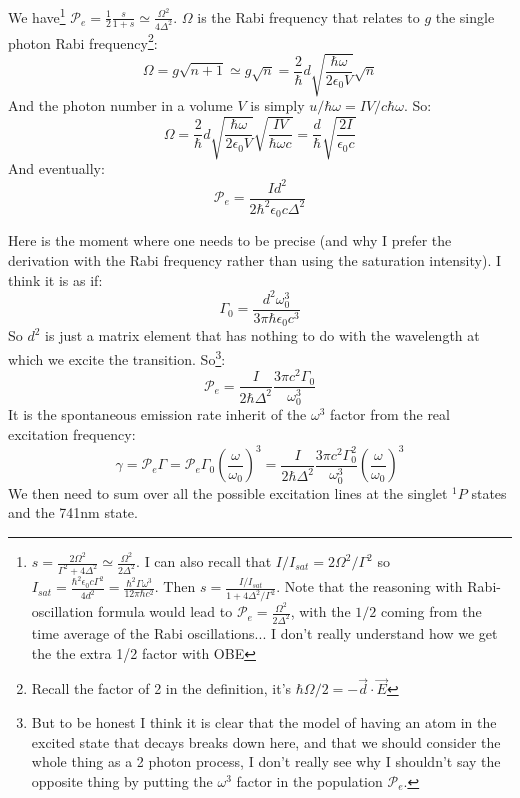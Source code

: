 \documentclass[reprint,amsmath,amssymb,aps,nofootinbib]{revtex4-1}
\begin{document}
We have\footnote{$s = \frac{2\Omega^{2}}{\Gamma^{2}+4\Delta^{2}}\simeq\frac{\Omega^{2}}{2\Delta^{2}}$. I can also recall that $I/I_{sat} = 2\Omega^{2}/\Gamma^{2}$ so $I_{sat} = \frac{\hbar^{2}\epsilon_{0}c\Gamma^{2}}{4d^{2}} = \frac{\hbar^{2}\Gamma\omega^{3}}{12\pi\hbar c^{2}}$. Then $s = \frac{I/I_{sat}}{1+4\Delta^{2}/\Gamma^{2}}$. Note that the reasoning with Rabi-oscillation formula would lead to $\mathcal{P}_{e} = \frac{\Omega^{2}}{2\Delta^{2}}$, with the $1/2$ coming from the time average of the Rabi oscillations... I don't really understand how we get the the extra 1/2 factor with OBE} $\mathcal{P}_{e}=\frac{1}{2}\frac{s}{1+s}\simeq \frac{\Omega^{2}}{4\Delta^{2}}$. $\Omega$ is the Rabi frequency that relates to $g$ the single photon Rabi frequency\footnote{Recall the factor of 2 in the definition, it's $\hbar\Omega/2=-\vec{d}\cdot \vec{E}$}:
\begin{equation}
\Omega = g\sqrt{n+1}\simeq g\sqrt{n} = \frac{2}{\hbar}d\sqrt{\frac{\hbar\omega}{2\epsilon_{0}V}}\sqrt{n}
\end{equation}
And the photon number in a volume $V$ is simply $u/\hbar\omega = IV/c\hbar\omega$. So:
\begin{equation}
\Omega = \frac{2}{\hbar}d\sqrt{\frac{\hbar\omega}{2\epsilon_{0}V}}\sqrt{\frac{IV}{\hbar\omega c}}= \frac{d}{\hbar}\sqrt{\frac{2I}{\epsilon_{0}c}}
\end{equation}
And eventually:
\begin{equation}
\mathcal{P}_{e} = \frac{Id^{2}}{2\hbar^{2}\epsilon_{0}c\Delta^{2}}
\end{equation}

Here is the moment where one needs to be precise (and why I prefer the derivation with the Rabi frequency rather than using the saturation intensity). I think it is as if:
\begin{equation}
\Gamma_{0} = \frac{d^{2}\omega_{0}^{3}}{3\pi\hbar\epsilon_{0}c^{3}}
\end{equation}
So $d^{2}$ is just a matrix element that has nothing to do with the wavelength at which we excite the transition. So\footnote{But to be honest I think it is clear that the model of having an atom in the excited state that decays breaks down here, and that we should consider the whole thing as a 2 photon process, I don't really see why I shouldn't say the opposite thing by putting the $\omega^{3}$ factor in the population $\mathcal{P}_{e}$.}:
\begin{equation}
\mathcal{P}_{e} = \frac{I}{2\hbar\Delta^{2}}\frac{3\pi c^{2}\Gamma_{0}}{\omega_{0}^{3}}
\end{equation}
It is the spontaneous emission rate inherit of the $\omega^{3}$ factor from the real excitation frequency:
\begin{equation}
\gamma = \mathcal{P}_{e}\Gamma = \mathcal{P}_{e}\Gamma_{0}\left(\frac{\omega}{\omega_{0}}\right)^{3} = \frac{I}{2\hbar\Delta^{2}}\frac{3\pi c^{2}\Gamma_{0}^{2}}{\omega_{0}^{3}}\left(\frac{\omega}{\omega_{0}}\right)^{3}
\end{equation}
We then need to sum over all the possible excitation lines at the singlet ${}^{1}P$ states and the 741nm state.
\end{document}
